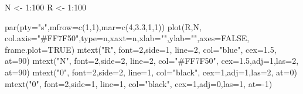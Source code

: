 \documentclass[
  a4paper,
]{scrbook}
\newenvironment{Shaded}{\begin{snugshade}}{\end{snugshade}}
\newcommand{\AttributeTok}[1]{\textcolor[rgb]{0.40,0.45,0.13}{#1}}
\newcommand{\ConstantTok}[1]{\textcolor[rgb]{0.56,0.35,0.01}{#1}}
\newcommand{\DecValTok}[1]{\textcolor[rgb]{0.68,0.00,0.00}{#1}}
\newcommand{\FloatTok}[1]{\textcolor[rgb]{0.68,0.00,0.00}{#1}}
\newcommand{\FunctionTok}[1]{\textcolor[rgb]{0.28,0.35,0.67}{#1}}
\newcommand{\NormalTok}[1]{\textcolor[rgb]{0.00,0.23,0.31}{#1}}
\newcommand{\OtherTok}[1]{\textcolor[rgb]{0.00,0.23,0.31}{#1}}
\newcommand{\SpecialCharTok}[1]{\textcolor[rgb]{0.37,0.37,0.37}{#1}}
\newcommand{\StringTok}[1]{\textcolor[rgb]{0.13,0.47,0.30}{#1}}
\theoremstyle{definition}
\theoremstyle{remark}
\begin{document}
\begin{Shaded}
\begin{Highlighting}[]
\NormalTok{N }\OtherTok{\textless{}{-}} \DecValTok{1}\SpecialCharTok{:}\DecValTok{100}
\NormalTok{R }\OtherTok{\textless{}{-}} \DecValTok{1}\SpecialCharTok{:}\DecValTok{100}

\FunctionTok{par}\NormalTok{(}\AttributeTok{pty=}\StringTok{"s"}\NormalTok{,}\AttributeTok{mfrow=}\FunctionTok{c}\NormalTok{(}\DecValTok{1}\NormalTok{,}\DecValTok{1}\NormalTok{),}\AttributeTok{mar=}\FunctionTok{c}\NormalTok{(}\DecValTok{4}\NormalTok{,}\FloatTok{3.3}\NormalTok{,}\DecValTok{1}\NormalTok{,}\DecValTok{1}\NormalTok{))}
\FunctionTok{plot}\NormalTok{(R,N,  }\AttributeTok{col.axis=}\StringTok{"\#FF7F50"}\NormalTok{,}\AttributeTok{type=}\StringTok{\textquotesingle{}n\textquotesingle{}}\NormalTok{,}\AttributeTok{xaxt=}\StringTok{\textquotesingle{}n\textquotesingle{}}\NormalTok{,}\AttributeTok{xlab=}\StringTok{""}\NormalTok{,}\AttributeTok{ylab=}\StringTok{""}\NormalTok{,}\AttributeTok{axes=}\ConstantTok{FALSE}\NormalTok{, }\AttributeTok{frame.plot=}\ConstantTok{TRUE}\NormalTok{)}
\FunctionTok{mtext}\NormalTok{(}\StringTok{"R"}\NormalTok{, }\AttributeTok{font=}\DecValTok{2}\NormalTok{,}\AttributeTok{side=}\DecValTok{1}\NormalTok{, }\AttributeTok{line=}\DecValTok{2}\NormalTok{, }\AttributeTok{col=}\StringTok{"blue"}\NormalTok{, }\AttributeTok{cex=}\FloatTok{1.5}\NormalTok{, }\AttributeTok{at=}\DecValTok{90}\NormalTok{)}
\FunctionTok{mtext}\NormalTok{(}\StringTok{"N"}\NormalTok{, }\AttributeTok{font=}\DecValTok{2}\NormalTok{,}\AttributeTok{side=}\DecValTok{2}\NormalTok{, }\AttributeTok{line=}\DecValTok{2}\NormalTok{, }\AttributeTok{col=}\StringTok{"\#FF7F50"}\NormalTok{, }\AttributeTok{cex=}\FloatTok{1.5}\NormalTok{,}\AttributeTok{adj=}\DecValTok{1}\NormalTok{,}\AttributeTok{las=}\DecValTok{2}\NormalTok{, }\AttributeTok{at=}\DecValTok{90}\NormalTok{)}
\FunctionTok{mtext}\NormalTok{(}\StringTok{"0"}\NormalTok{, }\AttributeTok{font=}\DecValTok{2}\NormalTok{,}\AttributeTok{side=}\DecValTok{2}\NormalTok{, }\AttributeTok{line=}\DecValTok{1}\NormalTok{, }\AttributeTok{col=}\StringTok{"black"}\NormalTok{, }\AttributeTok{cex=}\DecValTok{1}\NormalTok{,}\AttributeTok{adj=}\DecValTok{1}\NormalTok{,}\AttributeTok{las=}\DecValTok{2}\NormalTok{, }\AttributeTok{at=}\DecValTok{0}\NormalTok{)}
\FunctionTok{mtext}\NormalTok{(}\StringTok{"0"}\NormalTok{, }\AttributeTok{font=}\DecValTok{2}\NormalTok{,}\AttributeTok{side=}\DecValTok{1}\NormalTok{, }\AttributeTok{line=}\DecValTok{1}\NormalTok{, }\AttributeTok{col=}\StringTok{"black"}\NormalTok{, }\AttributeTok{cex=}\DecValTok{1}\NormalTok{,}\AttributeTok{adj=}\DecValTok{0}\NormalTok{,}\AttributeTok{las=}\DecValTok{1}\NormalTok{, }\AttributeTok{at=}\SpecialCharTok{{-}}\DecValTok{1}\NormalTok{)}

\end{Highlighting}
\end{Shaded}
\end{document}

